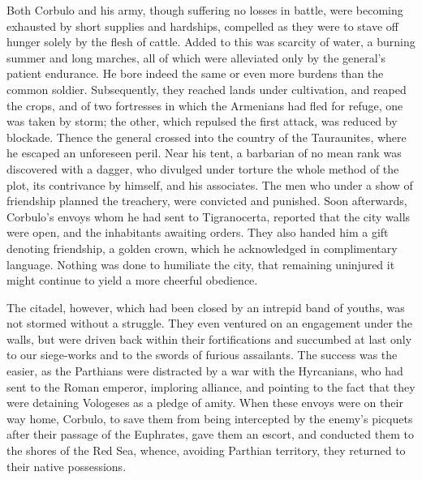
Both Corbulo and his army, though suffering no losses in battle, were becoming exhausted by short supplies and hardships, compelled as they were to stave off hunger solely by the flesh of cattle. Added to this was scarcity of water, a burning summer and long marches, all of which were alleviated only by the general's patient endurance. He bore indeed the same or even more burdens than the common soldier. Subsequently, they reached lands under cultivation, and reaped the crops, and of two fortresses in which the Armenians had fled for refuge, one was taken by storm; the other, which repulsed the first attack, was reduced by blockade. Thence the general crossed into the country of the Tauraunites, where he escaped an unforeseen peril. Near his tent, a barbarian of no mean rank was discovered with a dagger, who divulged under torture the whole method of the plot, its contrivance by himself, and his associates. The men who under a show of friendship planned the treachery, were convicted and punished. Soon afterwards, Corbulo's envoys whom he had sent to Tigranocerta, reported that the city walls were open, and the inhabitants awaiting orders. They also handed him a gift denoting friendship, a golden crown, which he acknowledged in complimentary language. Nothing was done to humiliate the city, that remaining uninjured it might continue to yield a more cheerful obedience.


The citadel, however, which had been closed by an intrepid band of youths, was not stormed without a struggle. They even ventured on an engagement under the walls, but were driven back within their fortifications and succumbed at last only to our siege-works and to the swords of furious assailants. The success was the easier, as the Parthians were distracted by a war with the Hyrcanians, who had sent to the Roman emperor, imploring alliance, and pointing to the fact that they were detaining Vologeses as a pledge of amity. When these envoys were on their way home, Corbulo, to save them from being intercepted by the enemy's picquets after their passage of the Euphrates, gave them an escort, and conducted them to the shores of the Red Sea, whence, avoiding Parthian territory, they returned to their native possessions.


